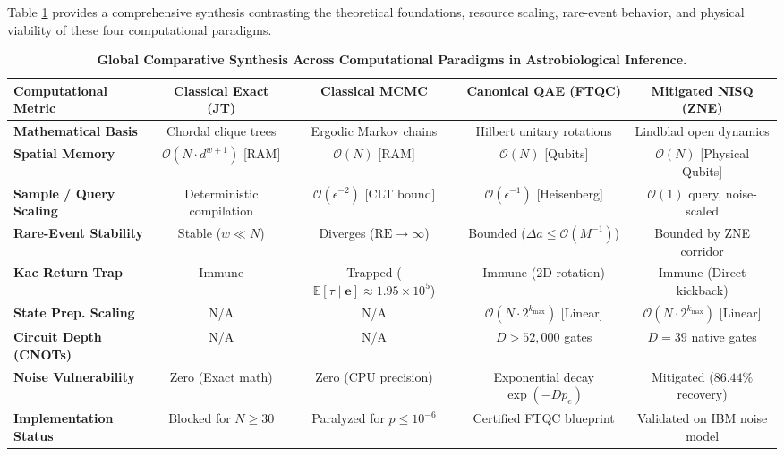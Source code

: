 Table \ref{tab:global_comparative_synthesis} provides a comprehensive synthesis contrasting the theoretical foundations, resource scaling, rare-event behavior, and physical viability of these four computational paradigms.

\begin{table}[htbp]
\centering
\caption{\textbf{Global Comparative Synthesis Across Computational Paradigms in Astrobiological Inference.}}
\label{tab:global_comparative_synthesis}
\begin{adjustbox}{max width=\textwidth}
\small
\begin{tabular}{lcccc}
\toprule
\textbf{Computational Metric} & \textbf{Classical Exact (JT)} & \textbf{Classical MCMC} & \textbf{Canonical QAE (FTQC)} & \textbf{Mitigated NISQ (ZNE)} \\
\midrule
\textbf{Mathematical Basis} & Chordal clique trees & Ergodic Markov chains & Hilbert unitary rotations & Lindblad open dynamics \\
\textbf{Spatial Memory} & $\mathcal{O}(N \cdot d^{w+1})$ [RAM] & $\mathcal{O}(N)$ [RAM] & $\mathcal{O}(N)$ [Qubits] & $\mathcal{O}(N)$ [Physical Qubits] \\
\textbf{Sample / Query Scaling} & Deterministic compilation & $\mathcal{O}(\epsilon^{-2})$ [CLT bound] & $\mathcal{O}(\epsilon^{-1})$ [Heisenberg] & $\mathcal{O}(1)$ query, noise-scaled \\
\textbf{Rare-Event Stability} & Stable ($w \ll N$) & Diverges ($\mathrm{RE} \to \infty$) & Bounded ($\Delta a \le \mathcal{O}(M^{-1})$) & Bounded by ZNE corridor \\
\textbf{Kac Return Trap} & Immune & Trapped ($\mathbb{E}[\tau \mid \mathbf{e}] \approx 1.95 \times 10^5$) & Immune (2D rotation) & Immune (Direct kickback) \\
\textbf{State Prep. Scaling} & N/A & N/A & $\mathcal{O}(N \cdot 2^{k_{\max}})$ [Linear] & $\mathcal{O}(N \cdot 2^{k_{\max}})$ [Linear] \\
\textbf{Circuit Depth (CNOTs)} & N/A & N/A & $D > 52,000$ gates & $D = 39$ native gates \\
\textbf{Noise Vulnerability} & Zero (Exact math) & Zero (CPU precision) & Exponential decay $\exp(-D p_e)$ & Mitigated ($86.44\%$ recovery) \\
\textbf{Implementation Status} & Blocked for $N \ge 30$ & Paralyzed for $p \le 10^{-6}$ & Certified FTQC blueprint & Validated on IBM noise model \\
\bottomrule
\end{tabular}
\end{adjustbox}
\end{table}

